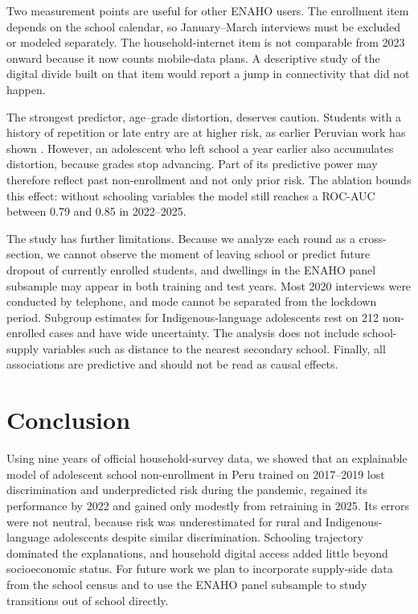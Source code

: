 \documentclass[conference]{IEEEtran}
\begin{document}
Two measurement points are useful for other ENAHO users. The enrollment item depends on the school calendar, so January--March interviews must be excluded or modeled separately. The household-internet item is not comparable from 2023 onward because it now counts mobile-data plans. A descriptive study of the digital divide built on that item would report a jump in connectivity that did not happen.

The strongest predictor, age--grade distortion, deserves caution. Students with a history of repetition or late entry are at higher risk, as earlier Peruvian work has shown \cite{cavero2011}. However, an adolescent who left school a year earlier also accumulates distortion, because grades stop advancing. Part of its predictive power may therefore reflect past non-enrollment and not only prior risk. The ablation bounds this effect: without schooling variables the model still reaches a ROC-AUC between 0.79 and 0.85 in 2022--2025.

The study has further limitations. Because we analyze each round as a cross-section, we cannot observe the moment of leaving school or predict future dropout of currently enrolled students, and dwellings in the ENAHO panel subsample may appear in both training and test years. Most 2020 interviews were conducted by telephone, and mode cannot be separated from the lockdown period. Subgroup estimates for Indigenous-language adolescents rest on 212 non-enrolled cases and have wide uncertainty. The analysis does not include school-supply variables such as distance to the nearest secondary school. Finally, all associations are predictive and should not be read as causal effects.

\section{Conclusion}

Using nine years of official household-survey data, we showed that an explainable model of adolescent school non-enrollment in Peru trained on 2017--2019 lost discrimination and underpredicted risk during the pandemic, regained its performance by 2022 and gained only modestly from retraining in 2025. Its errors were not neutral, because risk was underestimated for rural and Indigenous-language adolescents despite similar discrimination. Schooling trajectory dominated the explanations, and household digital access added little beyond socioeconomic status. For future work we plan to incorporate supply-side data from the school census and to use the ENAHO panel subsample to study transitions out of school directly.
\end{document}
